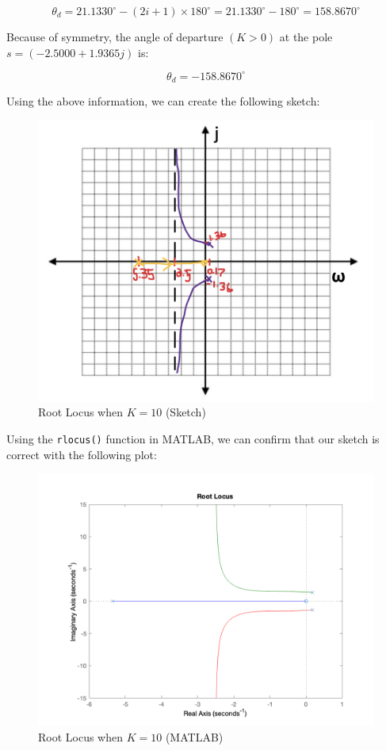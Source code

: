 \documentclass[12pt, letterpaper]{../assignment}
\begin{document}
$$ \theta_d = 21.1330^{\circ} - (2i+1)\times 180^{\circ} = 21.1330^{\circ} -180^{\circ}  = 158.8670^{\circ} $$

Because of symmetry, the angle of departure $(K > 0)$ at the pole $s = (-2.5000 + 1.9365j)$ is:

$$ \theta_d = -158.8670^{\circ} $$

Using the above information, we can create the following sketch:

\begin{figure}[H]
    \centering
    \includegraphics[width=0.5\linewidth]{./figures/Q2_sketch_2.png}
    \caption{Root Locus when $K = 10$ (Sketch)}
    \label{fig:step}
\end{figure}

Using the \texttt{rlocus()} function in MATLAB, we can confirm that our sketch is correct with the following plot:

\begin{figure}[H]
    \centering
    \includegraphics[width=0.7\linewidth]{./figures/Q2b_MATLAB_rootLocus.png}
    \caption{Root Locus when $K = 10$ (MATLAB)}
    \label{fig:step}
\end{figure}

\end{document}
